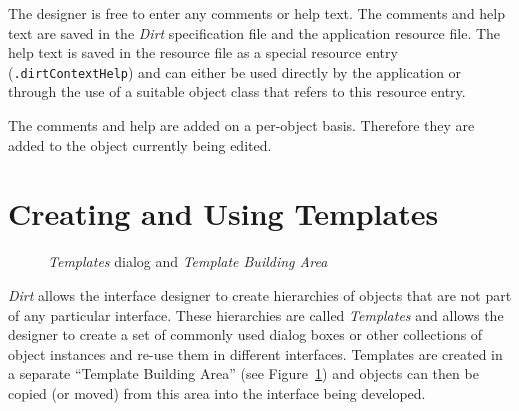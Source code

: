 The designer is free to enter any comments or help text.  The comments
and help text are saved in the {\em Dirt} specification file and the
application resource file.  The help text is saved in the resource file
as a special resource entry ({\tt .dirtContextHelp}) and can either be
used directly by the application or through the use of a suitable
object class that refers to this resource entry.

The comments and help are added on a per-object basis.  Therefore they are
added to the object currently being edited.

\section{Creating and Using Templates}
\label{sec:templates}
\begin{figure}
\centerline{}
\caption{{\em Templates} dialog and {\em Template Building Area}}
\label{fig:templates}
\end{figure}
{\em Dirt} allows the interface designer to create hierarchies of objects
that are not part of any particular interface.  These hierarchies are called
{\em Templates} and allows the designer to create a set of commonly used
dialog boxes or other collections of object instances and re-use them in
different interfaces.  Templates are created in a separate ``Template Building
Area'' (see Figure~\ref{fig:templates}) and objects can then be copied (or
moved) from this area into the interface being developed.

